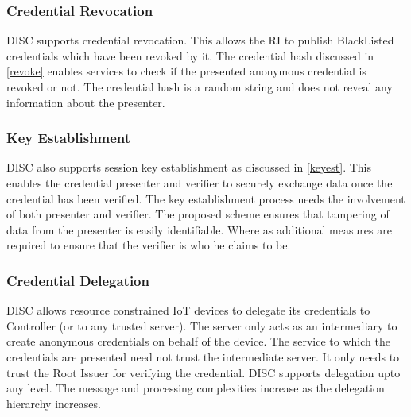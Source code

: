 \documentclass[journal]{IEEEtran}
\begin{document}
\subsubsection{Credential Revocation}
DISC supports credential revocation. This allows the RI to publish BlackListed credentials which have been revoked by it. The credential hash discussed in \ref{revoke} enables services to check if the presented anonymous credential is revoked or not. The credential hash is a random string and does not reveal any information about the presenter.

\subsubsection{Key Establishment}
DISC also supports session key establishment as discussed in \ref{keyest}. This enables the credential presenter and verifier to securely exchange data once the credential has been verified. The key establishment process needs the involvement of both presenter and verifier. The proposed scheme ensures that tampering of data from the presenter is easily identifiable. Where as additional measures are required to ensure that the verifier is who he claims to be.

\subsubsection{Credential Delegation}
DISC allows resource constrained IoT devices to delegate its credentials to Controller (or to any trusted server). The server only acts as an intermediary to create anonymous credentials on behalf of the device. The service to which the credentials are presented need not trust the intermediate server. It only needs to trust the Root Issuer for verifying the credential. DISC supports delegation upto any level. The message and processing complexities increase as the delegation hierarchy increases.
\end{document}
